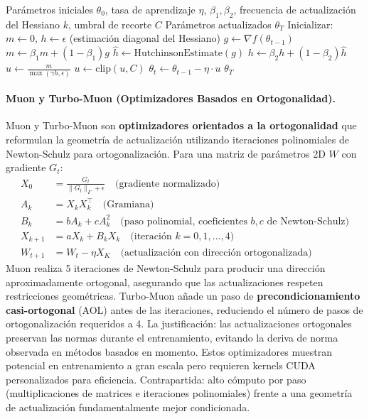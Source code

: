 \begin{algorithm}[H]
\caption{Sophia (Hessiano Diagonal con Actualizaciones Recortadas)}
\label{alg:sophia}
\begin{algorithmic}[1]
\Require Parámetros iniciales $\theta_0$, tasa de aprendizaje $\eta$, $\beta_1, \beta_2$, frecuencia de actualización del Hessiano $k$, umbral de recorte $C$ 
\Ensure Parámetros actualizados $\theta_T$
\State Inicializar: $m \gets 0$, $h \gets \epsilon$ (estimación diagonal del Hessiano)
    \State $g \gets \nabla f(\theta_{t-1})$
    \State $m \gets \beta_1 m + (1-\beta_1) g$ 
        \State $\hat{h} \gets \text{HutchinsonEstimate}(g)$ 
        \State $h \gets \beta_2 h + (1-\beta_2) \hat{h}$ 
    \EndIf
    \State $u \gets \frac{m}{\max(\gamma h, \epsilon)}$ 
    \State $u \gets \text{clip}(u, C)$ 
    \State $\theta_t \gets \theta_{t-1} - \eta \cdot u$
\EndFor
\Return $\theta_T$
\end{algorithmic}
\end{algorithm}

\paragraph{Muon y Turbo-Muon (Optimizadores Basados en Ortogonalidad).}
Muon y Turbo-Muon son \textbf{optimizadores orientados a la ortogonalidad} que reformulan la geometría de actualización utilizando iteraciones polinomiales de Newton-Schulz para ortogonalización. Para una matriz de parámetros 2D $W$ con gradiente $G_t$:
\begin{align}
X_0 &= \frac{G_t}{\|G_t\|_F + \epsilon} \quad\text{(gradiente normalizado)} \\
A_k &= X_k X_k^\top \quad\text{(Gramiana)} \\
B_k &= b A_k + c A_k^2 \quad\text{(paso polinomial, coeficientes $b, c$ de Newton-Schulz)} \\
X_{k+1} &= a X_k + B_k X_k \quad\text{(iteración $k=0,1,\ldots,4$)} \\
W_{t+1} &= W_t - \eta X_K \quad\text{(actualización con dirección ortogonalizada)}
\end{align}
Muon realiza 5 iteraciones de Newton-Schulz para producir una dirección aproximadamente ortogonal, asegurando que las actualizaciones respeten restricciones geométricas. Turbo-Muon añade un paso de \textbf{precondicionamiento casi-ortogonal} (AOL) antes de las iteraciones, reduciendo el número de pasos de ortogonalización requeridos a 4. La justificación: las actualizaciones ortogonales preservan las normas durante el entrenamiento, evitando la deriva de norma observada en métodos basados en momento. Estos optimizadores muestran potencial en entrenamiento a gran escala pero requieren kernels CUDA personalizados para eficiencia. Contrapartida: alto cómputo por paso (multiplicaciones de matrices e iteraciones polinomiales) frente a una geometría de actualización fundamentalmente mejor condicionada.

